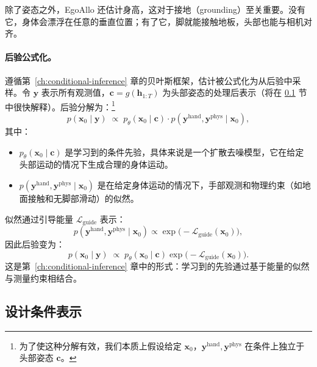 \documentclass[../../book-main_zh.tex]{subfiles}
\begin{document}
除了姿态之外，EgoAllo 还估计身高，这对于接地（grounding）至关重要。没有它，身体会漂浮在任意的垂直位置；有了它，脚就能接触地板，头部也能与相机对齐。

\paragraph{后验公式化。}
遵循第~\ref{ch:conditional-inference} 章的贝叶斯框架，估计被公式化为从后验中采样。令 $\boldsymbol{y}$ 表示所有观测值，$\boldsymbol{c} = g(\boldsymbol{h}_{1:T})$ 为头部姿态的处理后表示（将在 \ref{sub:egoallo_representation} 节中很快解释）。后验分解为：\footnote{为了使这种分解有效，我们本质上假设给定 $\boldsymbol{x}_0$，$\boldsymbol{y}^{\text{hand}}, \boldsymbol{y}^{\text{phys}}$ 在条件上独立于头部姿态 $\boldsymbol{c}$。}
\begin{equation}
    p(\boldsymbol{x}_0 \mid \boldsymbol{y}) \;\propto\; p_\theta(\boldsymbol{x}_0 \mid
    \boldsymbol{c}) \cdot p(\boldsymbol{y}^{\text{hand}},
    \boldsymbol{y}^{\text{phys}} \mid \boldsymbol{x}_0),
\end{equation}
其中：
\begin{itemize}
    \item $p_\theta(\boldsymbol{x}_0 \mid \boldsymbol{c})$ 是学习到的条件先验，具体来说是一个扩散去噪模型，它在给定头部运动的情况下生成合理的身体运动。
    \item $p(\boldsymbol{y}^{\text{hand}}, \boldsymbol{y}^{\text{phys}} \mid
        \boldsymbol{x}_0)$ 是在给定身体运动的情况下，手部观测和物理约束（如地面接触和无脚部滑动）的似然。
\end{itemize}

似然通过引导能量 $\mathcal{L}_{\text{guide}}$ 表示：
\begin{equation}
    p(\boldsymbol{y}^{\text{hand}}, \boldsymbol{y}^{\text{phys}} \mid
    \boldsymbol{x}_0) \propto \exp\big(-\mathcal{L}_{\text{guide}}(\boldsymbol{x}_0)\big),
\end{equation}
因此后验变为：
\begin{equation}
    \label{eq:egoallo_posterior}
    p(\boldsymbol{x}_0 \mid \boldsymbol{y}) \;\propto\; p_\theta(\boldsymbol{x}_0 \mid
    \boldsymbol{c}) \exp\big(-\mathcal{L}_{\text{guide}}(\boldsymbol{x}_0)\big).
\end{equation}
这是第~\ref{ch:conditional-inference} 章中的形式：学习到的先验通过基于能量的似然与测量约束相结合。

\subsection{设计条件表示}
\label{sub:egoallo_representation}
\end{document}
